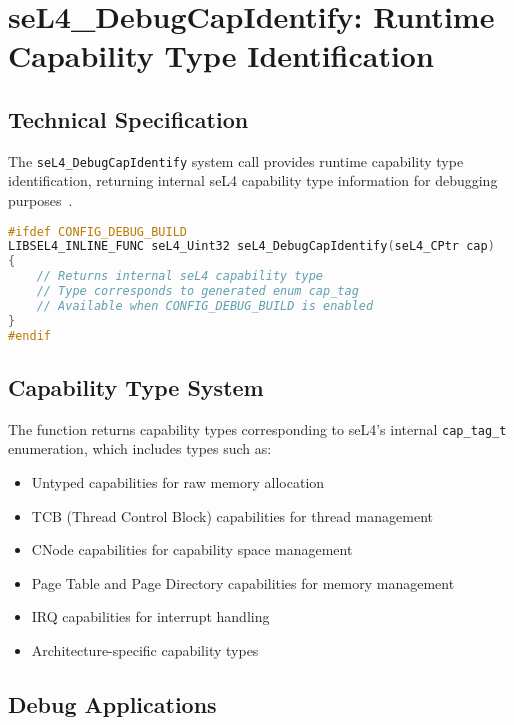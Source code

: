 \documentclass[11pt,a4paper]{article}
\begin{document}
\section{seL4\_DebugCapIdentify: Runtime Capability Type Identification}

\subsection{Technical Specification}

The \texttt{seL4\_DebugCapIdentify} system call provides runtime capability type identification, returning internal seL4 capability type information for debugging purposes~\cite{sel4-api-reference}.

\begin{lstlisting}[caption=seL4\_DebugCapIdentify System Call Interface, language=C]
#ifdef CONFIG_DEBUG_BUILD
LIBSEL4_INLINE_FUNC seL4_Uint32 seL4_DebugCapIdentify(seL4_CPtr cap)
{
    // Returns internal seL4 capability type
    // Type corresponds to generated enum cap_tag
    // Available when CONFIG_DEBUG_BUILD is enabled
}
#endif
\end{lstlisting}

\subsection{Capability Type System}

The function returns capability types corresponding to seL4's internal \texttt{cap\_tag\_t} enumeration, which includes types such as:

\begin{itemize}
\item Untyped capabilities for raw memory allocation
\item TCB (Thread Control Block) capabilities for thread management
\item CNode capabilities for capability space management  
\item Page Table and Page Directory capabilities for memory management
\item IRQ capabilities for interrupt handling
\item Architecture-specific capability types
\end{itemize}

\subsection{Debug Applications}
\end{document}
